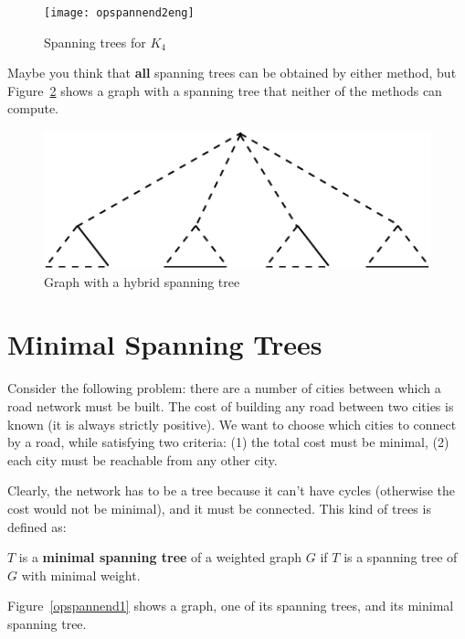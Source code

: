 \begin{figure}[ht]
\begin{center}
\texttt{[image: opspannend2eng]}
\end{center}
\caption{Spanning trees for $K_{4}$\label{opspannend2}}
\end{figure}

Maybe you think that {\bf all} spanning trees can be obtained by
either method, but Figure~\ref{opspannend5} shows a graph with a
spanning tree that neither of the methods can compute.

\begin{figure}[ht]
\begin{center}
\includegraphics[width=0.5\linewidth,keepaspectratio]{opspannend5}
\end{center}
\caption{Graph with a hybrid spanning tree\label{opspannend5}}
\end{figure}

\section{Minimal Spanning Trees}

Consider the following problem: there are a number of cities between
which a road network must be built. The cost of building any road
between two cities is known (it is always strictly positive). We want
to choose which cities to connect by a road, while satisfying two
criteria: (1) the total cost must be minimal, (2) each city must be
reachable from any other city.

Clearly, the network has to be a tree because it can't have cycles
(otherwise the cost would not be minimal), and it must be connected.
This kind of trees is defined as:

 \begin{definition}
\textup{$T$ is a \textbf{minimal spanning tree} of a weighted graph
$G$ if $T$ is a spanning tree of $G$ with minimal weight.}
\end{definition}

Figure~\ref{opspannend1} shows a graph, one of its spanning trees, and
its minimal spanning tree.

